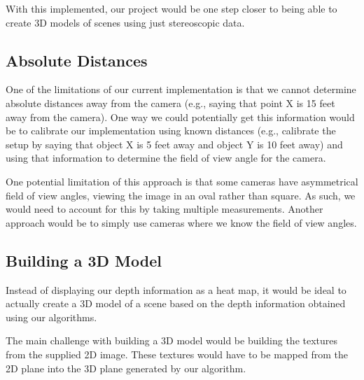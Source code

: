 With this implemented, our project would be one step closer to being able to create 3D models of scenes using just stereoscopic data.

\subsection{Absolute Distances}
One of the limitations of our current implementation is that we cannot determine absolute distances away from the camera (e.g., saying that point X is 15 feet away from the camera). One way we could potentially get this information would be to calibrate our implementation using known distances (e.g., calibrate the setup by saying that object X is 5 feet away and object Y is 10 feet away) and using that information to determine the field of view angle for the camera. 

One potential limitation of this approach is that some cameras have asymmetrical field of view angles, viewing the image in an oval rather than square. As such, we would need to account for this by taking multiple measurements. Another approach would be to simply use cameras where we know the field of view angles.

\subsection{Building a 3D Model}
Instead of displaying our depth information as a heat map, it would be ideal to actually create a 3D model of a scene based on the depth information obtained using our algorithms. 

The main challenge with building a 3D model would be building the textures from the supplied 2D image. These textures would have to be mapped from the 2D plane into the 3D plane generated by our algorithm. 
